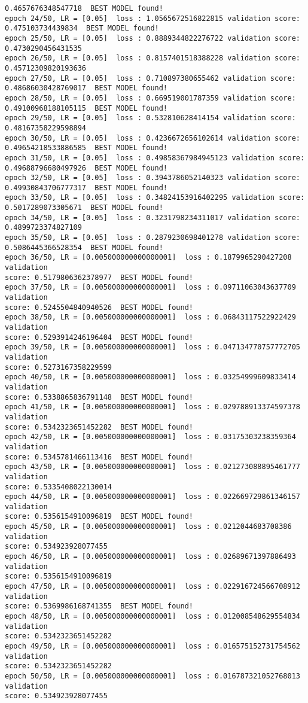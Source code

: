\documentclass[11pt]{article}
\begin{document}
\begin{Verbatim}[commandchars=\\\{\}]
0.4657676348547718  BEST MODEL found!
epoch 24/50, LR = [0.05]  loss : 1.0565672516822815 validation score:
0.475103734439834  BEST MODEL found!
epoch 25/50, LR = [0.05]  loss : 0.8889344822276722 validation score:
0.4730290456431535
epoch 26/50, LR = [0.05]  loss : 0.8157401518388228 validation score:
0.45712309820193636
epoch 27/50, LR = [0.05]  loss : 0.710897380655462 validation score:
0.48686030428769017  BEST MODEL found!
epoch 28/50, LR = [0.05]  loss : 0.669519001787359 validation score:
0.49100968188105115  BEST MODEL found!
epoch 29/50, LR = [0.05]  loss : 0.532810628414154 validation score:
0.48167358229598894
epoch 30/50, LR = [0.05]  loss : 0.4236672656102614 validation score:
0.49654218533886585  BEST MODEL found!
epoch 31/50, LR = [0.05]  loss : 0.49858367984945123 validation score:
0.49688796680497926  BEST MODEL found!
epoch 32/50, LR = [0.05]  loss : 0.3943786052140323 validation score:
0.49930843706777317  BEST MODEL found!
epoch 33/50, LR = [0.05]  loss : 0.34824153916402295 validation score:
0.5017289073305671  BEST MODEL found!
epoch 34/50, LR = [0.05]  loss : 0.3231798234311017 validation score:
0.4899723374827109
epoch 35/50, LR = [0.05]  loss : 0.2879230698401278 validation score:
0.5086445366528354  BEST MODEL found!
epoch 36/50, LR = [0.005000000000000001]  loss : 0.1879965290427208 validation
score: 0.5179806362378977  BEST MODEL found!
epoch 37/50, LR = [0.005000000000000001]  loss : 0.09711063043637709 validation
score: 0.5245504840940526  BEST MODEL found!
epoch 38/50, LR = [0.005000000000000001]  loss : 0.06843117522922429 validation
score: 0.5293914246196404  BEST MODEL found!
epoch 39/50, LR = [0.005000000000000001]  loss : 0.047134770757772705 validation
score: 0.5273167358229599
epoch 40/50, LR = [0.005000000000000001]  loss : 0.03254999609833414 validation
score: 0.5338865836791148  BEST MODEL found!
epoch 41/50, LR = [0.005000000000000001]  loss : 0.029788913374597378 validation
score: 0.5342323651452282  BEST MODEL found!
epoch 42/50, LR = [0.005000000000000001]  loss : 0.03175303238359364 validation
score: 0.5345781466113416  BEST MODEL found!
epoch 43/50, LR = [0.005000000000000001]  loss : 0.021273088895461777 validation
score: 0.5335408022130014
epoch 44/50, LR = [0.005000000000000001]  loss : 0.022669729861346157 validation
score: 0.5356154910096819  BEST MODEL found!
epoch 45/50, LR = [0.005000000000000001]  loss : 0.0212044683708386 validation
score: 0.534923928077455
epoch 46/50, LR = [0.005000000000000001]  loss : 0.02689671397886493 validation
score: 0.5356154910096819
epoch 47/50, LR = [0.005000000000000001]  loss : 0.022916724566708912 validation
score: 0.5369986168741355  BEST MODEL found!
epoch 48/50, LR = [0.005000000000000001]  loss : 0.012008548629554834 validation
score: 0.5342323651452282
epoch 49/50, LR = [0.005000000000000001]  loss : 0.016575152731754562 validation
score: 0.5342323651452282
epoch 50/50, LR = [0.005000000000000001]  loss : 0.016787321052768013 validation
score: 0.534923928077455\end{Verbatim}
\end{document}
